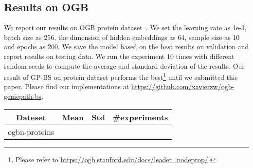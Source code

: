 \documentclass{article}
\begin{document}
\subsection{Results on OGB}
We report our results on 
OGB protein dataset~\cite{hu2020open}. We set the learning rate as 1e-3, batch size as 256, the dimension of hidden embeddings as 64, sample size as 10 and epochs as 200. We save the model based on the best results on validation and report results on testing data. We run the experiment 10 times with different random seeds to compute the average and standard deviation of the results. Our result of GP-BS on protein dataset performs the best\footnote{Please refer to \url{https://ogb.stanford.edu/docs/leader_nodeprop/}.}
until we submitted this paper. Please find our implementations at \url{https://github.com/xavierzw/ogb-geniepath-bs}.

\setlength{\tabcolsep}{1pt}
\begin{table}[H]
  \centering
  \begin{tabular}{cccc}
  	\toprule
    Dateset & Mean & Std & \#experiments \\
    \midrule
    ogbn-proteins&   &  &  \\
  \bottomrule
\end{tabular}
\end{table}
\end{document}

